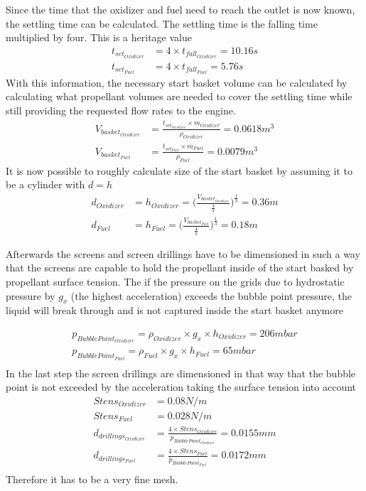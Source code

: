Since the time that the oxidizer and fuel need to reach the outlet is now known, the settling time can be calculated. The settling time is the falling time multiplied by four. This is a heritage value
\begin{align}
    t_{set_{Oxidizer}} &= 4\times t_{fall_{Oxidizer}} = 10.16s\\
    t_{set_{Fuel}} &= 4\times t_{fall_{Fuel}} = 5.76s
\end{align}
With this information, the necessary start basket volume can be calculated by calculating what propellant volumes are needed to cover the settling time while still providing the requested flow rates to the engine.
\begin{align}
    V_{basket_{Oxidizer}} &= \frac{t_{set_{Oxidizer}} \times \dot{m_{Oxidizer}}}{\rho_{Oxidizer}} = 0.0618m^3\\
    V_{basket_{Fuel}} &= \frac{t_{set_{Fuel}} \times \dot{m_{Fuel}}}{\rho_{Fuel}} = 0.0079m^3
\end{align}{}
It is now possible to roughly calculate size of the start basket by assuming it to be a cylinder with $d=h$
\begin{align}
    d_{Oxidizer} &= h_{Oxidizer} = \bigg(\frac{V_{basket_{Oxidizer}}}{\frac{4}{\pi}}\bigg)^{\frac{1}{3}} = 0.36m\\
    d_{Fuel} &= h_{Fuel} = \bigg(\frac{V_{basket_{Fuel}}}{\frac{4}{\pi}}\bigg)^{\frac{1}{3}} = 0.18m
\end{align}{}

Afterwards the screens and screen drillings have to be dimensioned in such a way that the screens are capable to hold the propellant inside of the start basked by propellant surface tension. The if the pressure on the grids due to hydrostatic pressure by $g_x$ (the highest acceleration) exceeds the bubble point pressure, the liquid will break through and is not captured inside the start basket anymore

\begin{align}
    p_{BubblePoint_{Oxidizer}} = \rho_{Oxidizer}\times g_x \times h_{Oxidizer} = 206mbar\\
    p_{BubblePoint_{Fuel}} = \rho_{Fuel}\times g_x \times h_{Fuel} = 65mbar\\
\end{align}{}
In the last step the screen drillings are dimensioned in that way that the bubble point is not exceeded by the acceleration taking the surface tension into account
\begin{align}
    Stens_{Oxidizer} &= 0.08 N/m\\
    Stens_{Fuel} &= 0.028 N/m\\
    d_{drillings_{Oxidizer}} &= \frac{4\times Stens_{Oxidizer}}{p_{BubblePoint_{Oxidizer}}} = 0.0155mm\\
    d_{drillings_{Fuel}} &= \frac{4\times Stens_{Fuel}}{p_{BubblePoint_{Fuel}}} = 0.0172mm\\
\end{align}{}
Therefore it has to be a very fine mesh. 
